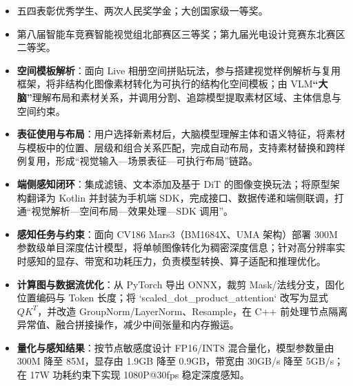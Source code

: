 
\begin{itemize}
  \item 五四表彰优秀学生、两次人民奖学金；大创国家级一等奖。
  \item 第八届智能车竞赛智能视觉组北部赛区三等奖；第九届光电设计竞赛东北赛区二等奖。
\end{itemize}

\begin{itemize}
  \item \textbf{空间模板解析}：面向 Live 相册空间拼贴玩法，参与搭建视觉样例解析与复用框架，将非结构化图像素材转化为可执行的结构化空间模板；由 VLM\textbf{“大脑”}理解布局和素材关系，并调用分割、追踪模型提取素材区域、主体信息与空间约束。
  \item \textbf{表征使用与布局}：用户选择新素材后，大脑模型理解主体和语义特征，将素材与模板中的位置、层级和组合关系匹配，完成自动布局，支持素材替换和跨样例复用，形成“视觉输入—场景表征—可执行布局”链路。
  \item \textbf{端侧感知闭环}：集成滤镜、文本添加及基于 DiT 的图像变换玩法；将原型架构翻译为 Kotlin 并封装为手机端 SDK，完成接口、数据传递和端侧联调，打通“视觉解析—空间布局—效果处理—SDK 调用”。
\end{itemize}

\begin{itemize}
  \item \textbf{感知任务与约束}：面向 CV186 Mars3（BM1684X、UMA 架构）部署 300M 参数级单目深度估计模型，将单帧图像转化为稠密深度信息；针对高分辨率实时感知的显存、带宽和功耗压力，负责模型转换、算子适配和推理优化。
  \item \textbf{计算图与数据流优化}：从 PyTorch 导出 ONNX，裁剪 Mask/法线分支，固化位置编码与 Token 长度；将 `scaled\_dot\_product\_attention` 改写为显式 $QK^T$，并改造 GroupNorm/LayerNorm、Resample，在 C++ 前处理节点隔离异常值、融合拼接操作，减少中间张量和内存搬运。
  \item \textbf{量化与感知结果}：按节点敏感度设计 FP16/INT8 混合量化，模型参数量由 300M 降至 85M，显存由 1.9GB 降至 0.9GB，带宽由 30GB/s 降至 5GB/s；在 17W 功耗约束下实现 1080P@30fps 稳定深度感知。
\end{itemize}


